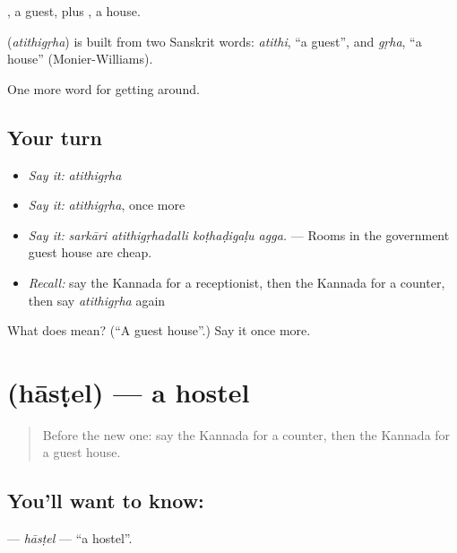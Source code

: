 , a guest, plus , a house.

\begin{cousinweb}
\textbf{} (\emph{atithigṛha}) is built from two Sanskrit words: \emph{atithi}, \textquotedblleft{}a guest\textquotedblright{}, and \emph{gṛha}, \textquotedblleft{}a house\textquotedblright{} (Monier-Williams).
\end{cousinweb}

\begin{grammarlens}[title={What you've built}]
One more word for getting around.
\end{grammarlens}

\subsection*{Your turn}
\begin{itemize}
\raggedright
  \item \emph{Say it:} \emph{atithigṛha}
  \item \emph{Say it:} \emph{atithigṛha}, once more
  \item \emph{Say it:} \emph{sarkāri atithigṛhadalli koṭhaḍigaḷu agga.} — Rooms in the government guest house are cheap.
  \item \emph{Recall:} say the Kannada for a receptionist, then the Kannada for a counter, then say \emph{atithigṛha} again
\end{itemize}

\begin{tcolorbox}[breakable,colback=teal!4,colframe=teal!35!black,title={Before you move on}]
What does  mean? (\textquotedblleft{}A guest house\textquotedblright{}.) Say it once more.
\end{tcolorbox}
\section[\texorpdfstring{\kn{ಹಾಸ್ಟೆಲ್} (hāsṭel)}{ಹಾಸ್ಟೆಲ್ (hāsṭel)}]{ (hāsṭel) — a hostel}

\label{lesson:KA-C461-hastel}



\begin{quote}
Before the new one: say the Kannada for a counter, then the Kannada for a guest house.
\end{quote}

\subsection*{You'll want to know: }
\textbf{} — \emph{hāsṭel} — \textquotedblleft{}a hostel\textquotedblright{}.

